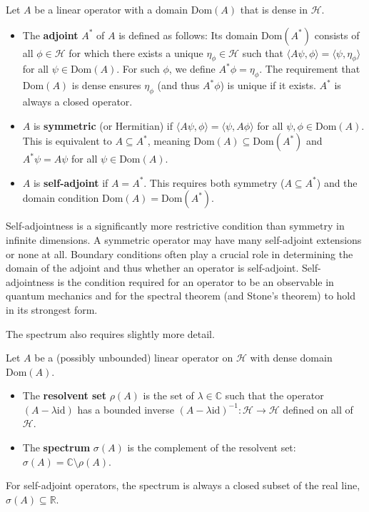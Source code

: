 \begin{definition}
Let $A$ be a linear operator with a domain $\text{Dom}(A)$ that is dense in $\mathcal{H}$.
\begin{itemize}
    \item The \textbf{adjoint} $A^*$ of $A$ is defined as follows: Its domain $\text{Dom}(A^*)$ consists of all $\phi \in \mathcal{H}$ for which there exists a unique $\eta_\phi \in \mathcal{H}$ such that $\langle A\psi, \phi \rangle = \langle \psi, \eta_\phi \rangle$ for all $\psi \in \text{Dom}(A)$. For such $\phi$, we define $A^*\phi = \eta_\phi$. The requirement that $\text{Dom}(A)$ is dense ensures $\eta_\phi$ (and thus $A^*\phi$) is unique if it exists. $A^*$ is always a closed operator.
    \item $A$ is \textbf{symmetric} (or Hermitian) if $\langle A\psi, \phi \rangle = \langle \psi, A\phi \rangle$ for all $\psi, \phi \in \text{Dom}(A)$. This is equivalent to $A \subseteq A^*$, meaning $\text{Dom}(A) \subseteq \text{Dom}(A^*)$ and $A^*\psi = A\psi$ for all $\psi \in \text{Dom}(A)$.
    \item $A$ is \textbf{self-adjoint} if $A = A^*$. This requires both symmetry ($A \subseteq A^*$) and the domain condition $\text{Dom}(A) = \text{Dom}(A^*)$.
\end{itemize}
Self-adjointness is a significantly more restrictive condition than symmetry in infinite dimensions. A symmetric operator may have many self-adjoint extensions or none at all. Boundary conditions often play a crucial role in determining the domain of the adjoint and thus whether an operator is self-adjoint. Self-adjointness is the condition required for an operator to be an observable in quantum mechanics and for the spectral theorem (and Stone's theorem) to hold in its strongest form.
\end{definition}

The spectrum also requires slightly more detail.

\begin{definition}
Let $A$ be a (possibly unbounded) linear operator on $\mathcal{H}$ with dense domain $\text{Dom}(A)$.
\begin{itemize}
    \item The \textbf{resolvent set} $\rho(A)$ is the set of $\lambda \in \mathbb{C}$ such that the operator $(A - \lambda \text{id})$ has a bounded inverse $(A - \lambda \text{id})^{-1}: \mathcal{H} \to \mathcal{H}$ defined on all of $\mathcal{H}$.
    \item The \textbf{spectrum} $\sigma(A)$ is the complement of the resolvent set: $\sigma(A) = \mathbb{C} \setminus \rho(A)$.
\end{itemize}
For self-adjoint operators, the spectrum is always a closed subset of the real line, $\sigma(A) \subseteq \mathbb{R}$.
\end{definition}

